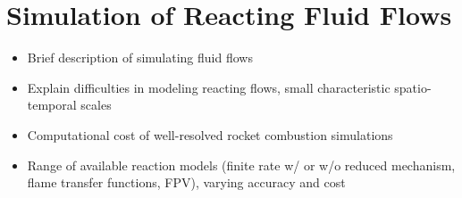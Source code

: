 \section{Simulation of Reacting Fluid Flows}

\begin{itemize}
    \item Brief description of simulating fluid flows
    \item Explain difficulties in modeling reacting flows, small characteristic spatio-temporal scales
    \item Computational cost of well-resolved rocket combustion simulations
    \item Range of available reaction models (finite rate w/ or w/o reduced mechanism, flame transfer functions, FPV), varying accuracy and cost
\end{itemize}